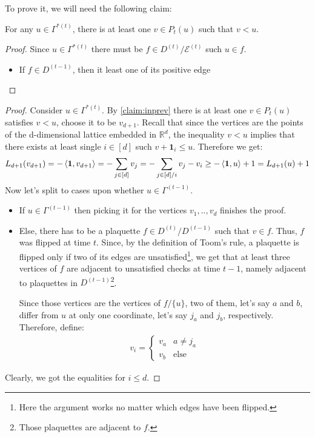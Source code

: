To prove it, we will need the following claim:
\begin{claim}
  \label{claim:inprev}
For any $u \in \Gamma^{* (t)}$, there is at least one $v \in P_{t}(u)$ such that $v < u$.
\end{claim}
\begin{proof}
  Since $u \in \Gamma^{*(t)}$ there must be $f \in D^{(t)}/\mathcal{E}^{(t)}$ such $u \in f$.
  \begin{itemize}
    \item If $f \in D^{(t-1)}$, then it least one of its positive edge
  \end{itemize}
\end{proof}

\begin{proof}
  Consider $u \in \Gamma^{* (t)}$. By \cref{claim:inprev} there is at least one $v \in P_{t}(u)$ satisfies $v < u$, choose it to be $v_{d+1}$. Recall that since the vertices are the points of the d-dimensional lattice embedded in $\mathbb{R}^{d}$, the inequality $v <u$ implies that there exists at least single $i \in[d]$ such $ v+ \mathbf{1}_{i} \le u$. Therefore we get: 
  \begin{equation*}
    \begin{split}
      L_{d+1}(v_{d+1}) = -\braket{ \mathbf{1}, v_{d+1} } = -\sum_{j \in [d]}v_{j} =  -\sum_{j \in [d]/i}v_{j} - v_{i} \ge  -\braket{ \mathbf{1}, u } + 1 = L_{d+1}(u) + 1
    \end{split}
  \end{equation*}
  Now let's split to cases upon whether $u \in \Gamma^{(t-1)}$. 
  \begin{itemize}
    \item If $u \in \Gamma^{(t-1)}$ then picking it for the vertices $v_{1},..,v_{d}$ finishes the proof.
    \item Else, there has to be a plaquette $f \in D^{(t)}/D^{(t-1)}$ such that $v \in f$. Thus, $f$ was flipped at time $t$. Since, by the definition of Toom's rule, a plaquette is flipped only if two of its edges are unsatisfied\footnote{Here the argument works no matter which edges have been flipped.}, we get that at least three vertices of $f$ are adjacent to unsatisfied checks at time $t-1$, namely adjacent to plaquettes in $D^{(t-1)}$\footnote{Those plaquettes are adjacent to $f$.}.
      
Since those vertices are the vertices of $f / \{u\}$, two of them, let's say $a$ and $b$, differ from $u$ at only one coordinate, let's say $j_{a}$ and $j_{b}$, respectively. Therefore, define:
      \begin{equation*}
        \begin{split} v_{i} = 
          \begin{cases}
            v_{a} & a \neq j_{a} \\ 
            v_{b} & \text{else}
          \end{cases}
        \end{split}
      \end{equation*}
  \end{itemize}
  Clearly, we got the equalities for $i \le d$.
\end{proof}

